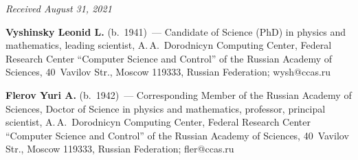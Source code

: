 \vspace*{-3pt}

\hfill{\small\textit{Received August 31, 2021}}


      
      \Contr
      
      
  \noindent
  \textbf{Vyshinsky Leonid L.} (b.\ 1941)~--- Candidate of Science (PhD) in physics and 
mathematics, leading scientist, A.\,A.~Dorodnicyn Computing Center, Federal Research Center 
``Computer Science and Control'' of the Russian Academy of Sciences, 40~Vavilov Str., Moscow 
119333, Russian Federation; \mbox{wysh@ccas.ru} 
  
  \vspace*{6pt}
  
  \noindent
  \textbf{Flerov Yuri A.} (b.\ 1942)~--- Corresponding Member of the Russian Academy of 
Sciences, Doctor of Science in physics and mathematics, professor, principal scientist, 
A.\,A.~Dorodnicyn Computing Center, Federal Research Center ``Computer Science and Control'' of 
the Russian Academy of Sciences, 40~Vavilov Str., Moscow 119333, Russian Federation; 
\mbox{fler@ccas.ru}

\label{end\stat}

\renewcommand{\bibname}{\protect\rm Литература}
      